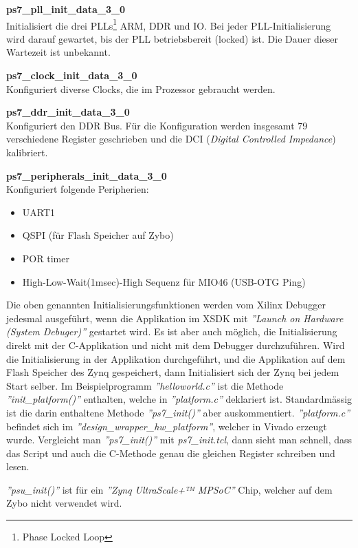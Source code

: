 \textbf{ps7\_pll\_init\_data\_3\_0}\\
Initialisiert die drei PLLs\footnote{Phase Locked Loop} ARM, DDR und IO.
Bei jeder PLL-Initialisierung wird darauf gewartet, bis der PLL betriebsbereit (locked) ist.
Die Dauer dieser Wartezeit ist unbekannt.

\textbf{ps7\_clock\_init\_data\_3\_0}\\
Konfiguriert diverse Clocks, die im Prozessor gebraucht werden.

\textbf{ps7\_ddr\_init\_data\_3\_0}\\
Konfiguriert den DDR Bus.
Für die Konfiguration werden insgesamt 79 verschiedene Register geschrieben und die DCI (\textit{Digital Controlled Impedance}) kalibriert.

\textbf{ps7\_peripherals\_init\_data\_3\_0}\\
Konfiguriert folgende Peripherien:
\begin{itemize}
\item UART1
\item QSPI (für Flash Speicher auf Zybo)
\item POR timer
\item High-Low-Wait(1msec)-High Sequenz für MIO46 (USB-OTG Ping)
\end{itemize}  




Die oben genannten Initialisierungsfunktionen werden vom Xilinx Debugger jedesmal ausgeführt, wenn die Applikation im XSDK mit \textit{''Launch on Hardware (System Debuger)''} gestartet wird.
Es ist aber auch möglich, die Initialisierung direkt mit der C-Applikation und nicht mit dem Debugger durchzuführen.
Wird die Initialisierung in der Applikation durchgeführt, und die Applikation auf dem Flash Speicher des Zynq gespeichert, dann Initialisiert sich der Zynq bei jedem Start selber.
Im Beispielprogramm \textit{''helloworld.c''} ist die Methode \textit{''init\_platform()''} enthalten, welche in \textit{''platform.c''} deklariert ist.
Standardmässig ist die darin enthaltene Methode \textit{''ps7\_init()''} aber auskommentiert.
\textit{''platform.c''} befindet sich im \textit{''design\_wrapper\_hw\_platform''}, welcher in Vivado erzeugt wurde.
Vergleicht man \textit{''ps7\_init()''} mit \textit{ps7\_init.tcl}, dann sieht man schnell, dass das Script und auch die C-Methode genau die gleichen Register schreiben und lesen.

\textit{''psu\_init()''} ist für ein \textit{''Zynq UltraScale+™ MPSoC''} Chip, welcher auf dem Zybo nicht verwendet wird.


